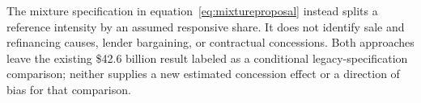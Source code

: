 The mixture specification in equation~\eqref{eq:mixtureproposal} instead splits a reference intensity by an assumed responsive share. It does not identify sale and refinancing causes, lender bargaining, or contractual concessions. Both approaches leave the existing \$42.6 billion result labeled as a conditional legacy-specification comparison; neither supplies a new estimated concession effect or a direction of bias for that comparison.
